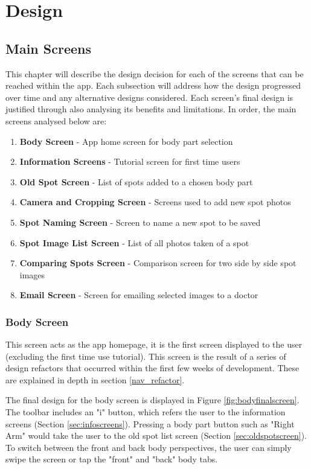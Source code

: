 \chapter{Design}
\section{Main Screens}
This chapter will describe the design decision for each of the screens that can be reached within the app. Each subsection will address how the design progressed over time and any alternative designs considered. Each screen's final design is justified through also analysing its benefits and limitations. In order, the main screens analysed below are:
\begin{enumerate}
    \item \textbf{Body Screen} - App home screen for body part selection 
    \item \textbf{Information Screens} - Tutorial screen for first time users
    \item \textbf{Old Spot Screen} - List of spots added to a chosen body part
    \item \textbf{Camera and Cropping Screen} - Screens used to add new spot photos
    \item \textbf{Spot Naming Screen} - Screen to name a new spot to be saved
    \item \textbf{Spot Image List Screen} - List of all photos taken of a spot
    \item \textbf{Comparing Spots Screen} - Comparison screen for two side by side spot images
    \item \textbf{Email Screen} - Screen for emailing selected images to a doctor
    
\end{enumerate}

\subsection{Body Screen}
This screen acts as the app homepage, it is the first screen displayed to the user (excluding the first time use tutorial). This screen is the result of a series of design refactors that occurred within the first few weeks of development. These are explained in depth in section \ref{nav_refactor}. 

The final design for the body screen is displayed in Figure \ref{fig:bodyfinalscreen}. The toolbar includes an "i" button, which refers the user to the information screens (Section \ref{sec:infoscreens}). Pressing a body part button such as "Right Arm" would take the user to the old spot list screen (Section \ref{sec:oldspotscreen}). To switch between the front and back body perspectives, the user can simply swipe the screen or tap the "front" and "back" body tabs.

